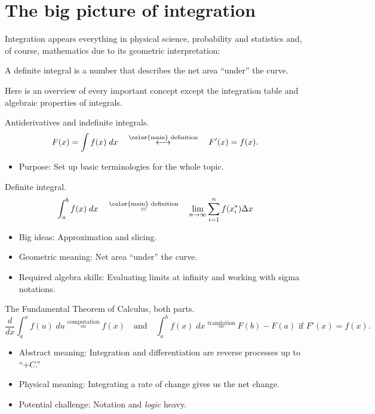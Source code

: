\documentclass[../main.tex]{subfiles}
\begin{document}
 \section{The big picture of integration}
  Integration appears everything in physical science, probability and statistics and, of course, mathematics due to its geometric interpretation:

  \medskip
  \begin{mdframed}[style=simple]
    \centering
    \color{main}
    A definite integral is a number that describes the net area ``under'' the curve.
  \end{mdframed}

  Here is an overview of every important concept except the integration table and algebraic properties of integrals.
  \begin{description}[itemsep=2ex]
    \item[Terminologies.] Antiderivatives and indefinite integrals.
      \[
        F(x) = \int f(x) \;dx \quad\overset{\text{\color{main} definition}}{\longleftrightarrow}\quad F'(x) = f(x).
      \]        
      \begin{itemize}
        \item Purpose: Set up basic terminologies for the whole topic.
      \end{itemize}

    \item[Concept.] Definite integral.
      \[
        \int_{a}^{b} f(x) \; dx \quad\overset{\text{\color{main} definition}}{=}\quad \lim_{n \to \infty} \sum_{i=1}^{n} f(x_{i}^{*}) {\Delta x}
      \]

      \begin{itemize}
        \item Big ideas: Approximation and slicing.
        \item Geometric meaning: Net area ``under'' the curve.
        \item Required algebra skills: Evaluating limits at infinity and working with sigma notations.
      \end{itemize}

    \item[Theorem.] The Fundamental Theorem of Calculus, both parts. 
      \[
        \frac{d}{dx} \int_{a}^{x} f(u) \;du \overset{\text{computation}}{=} f(x) \quad\text{and}\quad \int_{a}^{b} f(x) \;dx \overset{\text{translation}}{=} F(b) - F(a) \text{ if } F'(x) = f(x).
      \]
      \begin{itemize}
        \item Abstract meaning: Integration and differentiation are reverse processes up to ``\(+C\).''
        \item Physical meaning: Integrating a rate of change gives us the net change.
        \item Potential challenge: Notation and \emph{logic} heavy.
      \end{itemize}


\end{description}
\end{document}
